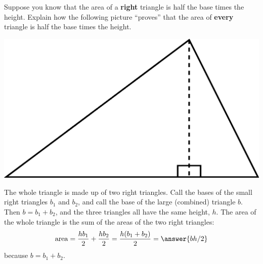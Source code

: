 \documentclass[nooutcomes]{ximera}
\begin{document}
\begin{problem}
Suppose you know that the area of a \textbf{right} triangle is
  half the base times the height. Explain how the following picture
  ``proves'' that the area of \textbf{every} triangle is half the base times the
  height.
\begin{image}
\includegraphics{pbpDisTri.png}
\end{image}
\begin{freeResponse}
\begin{hint}
The whole triangle is made up of two right triangles.  Call the bases of the small right triangles $b_1$ and $b_2$, and call the base of the large (combined) triangle $b$.  Then $b=b_1+b_2$, and the three triangles all have the same height, $h$.   The area of the whole triangle is the sum of the areas of the two right triangles:  
\[
\mathrm{area} =  \frac{hb_1}{2}+ \frac{hb_2}{2}= \frac{h(b_1 + b_2)}{2} = \answer{bh/2}
\]
because $b=b_1+b_2$.
\end{hint}
\end{freeResponse}
\end{problem}
\end{document}
